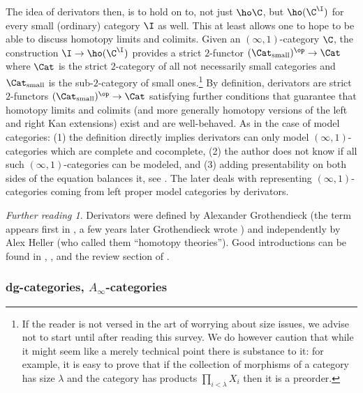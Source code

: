 \documentclass[12pt]{amsart}
\theoremstyle{definition} \newtheorem{definition}[theorem]{Definition}
\theoremstyle{remark} \newtheorem{remark}[theorem]{Remark}
\newtheorem*{further}{Further reading}
\numberwithin{equation}{section}
\newcommand{\oo}{\infty}
\newcommand{\io}{$(\oo,1)$}
\begin{document}
The idea of derivators then, is to hold on to, not just $\ho\C$, but
$\ho(\C^\I)$ for every small (ordinary) category $\I$ as well. This at
least allows one to hope to be able to discuss homotopy limits and
colimits. Given an \io-category $\C$, the construction $\I \to
\ho(\C^\I)$ provides a strict $2$-functor $(\Cat_\text{small})^{\op}
\to \Cat$ where $\Cat$ is the strict $2$-category of all not
necessarily small categories and $\Cat_\text{small}$ is the
sub-$2$-category of small ones.\footnote{If the reader is not versed
in the art of worrying about size issues, we advise not to start until
after reading this survey. We do however caution that while it might
seem like a merely technical point there is substance to it: for
example, it is easy to prove that if the collection of morphisms of a
category has size $\lambda$ and the category has products
$\prod_{i<\lambda} X_i$ then it is a preorder.} By definition,
derivators are strict $2$-functors $(\Cat_\text{small})^{\op} \to
\Cat$ satisfying further conditions that guarantee that homotopy
limits and colimits (and more generally homotopy versions of the left
and right Kan extensions) exist and are well-behaved. As in the case
of model categories: (1) the definition directly implies derivators
can only model \io-categories which are complete and cocomplete, (2)
the author does not know if all such \io-categories can be modeled,
and (3) adding presentability on both sides of the equation balances
it, see \cite{RenaudinPres}. The later \cite{RenaudinLP} deals with
representing \io-categories coming from left proper model categories
by derivators.

\begin{further} Derivators were defined by Alexander Grothendieck (the
term appears first in \cite{PursuingStacks}, a few years later
Grothendieck wrote \cite{Derivateurs}) and independently by Alex
Heller \cite{Heller} (who called them ``homotopy theories''). Good
introductions can be found in \cite{Maltsiniotis}, \cite{GrothDer}, and
the review section of \cite{ShulmanPontoGroth}. \end{further}

\subsubsection{dg-categories, $A_\oo$-categories}
\end{document}
